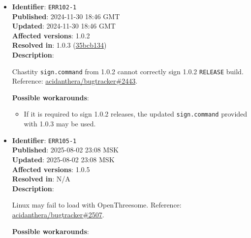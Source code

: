 \documentclass[]{article}
\providecommand{\tightlist}{%
  \setlength{\itemsep}{0pt}\setlength{\parskip}{0pt}}
\begin{document}
\begin{itemize}
  \textbf{Possible workarounds}:
  \begin{itemize}
    \tightlist

    \item For 0.9.8 use version of \texttt{ocvalidate} provided in a
    \href{https://github.com/acidanthera/bugtracker/issues/2379#issuecomment-1933674398}{comment}
    on the above issue.

  \end{itemize}

  \item
  \textbf{Identifier}: \texttt{ERR102-1} \\
  \textbf{Published}: 2024-11-30 18:46 GMT \\
  \textbf{Updated}: 2024-11-30 18:46 GMT \\
  \textbf{Affected versions}: 1.0.2 \\
  \textbf{Resolved in}: 1.0.3 (\href{https://github.com/acidanthera/OpenCorePkg/commit/35bcb134f19df7c04275142e22c9fec68b72ff2d}{35bcb134}) \\
  \textbf{Description}:

  Chastity \texttt{sign.command} from 1.0.2 cannot correctly sign 1.0.2 \texttt{RELEASE} build. Reference:
  \href{https://github.com/acidanthera/bugtracker/issues/2443}{acidanthera/bugtracker\#2443}.

  \textbf{Possible workarounds}:
  \begin{itemize}
    \tightlist

    \item If it is required to sign 1.0.2 releases, the updated
    \texttt{sign.command} provided with 1.0.3 may be used.
  \end{itemize}

\item
  \textbf{Identifier}: \texttt{ERR105-1} \\
  \textbf{Published}: 2025-08-02 23:08 MSK \\
  \textbf{Updated}: 2025-08-02 23:08 MSK \\
  \textbf{Affected versions}: 1.0.5 \\
  \textbf{Resolved in}: N/A \\
  \textbf{Description}:

  Linux may fail to load with OpenThreesome. Reference:
  \href{https://github.com/acidanthera/bugtracker/issues/2507}{acidanthera/bugtracker\#2507}.

  \textbf{Possible workarounds}:
  \begin{itemize}
    \tightlist


\end{itemize}
\end{itemize}
\end{document}

